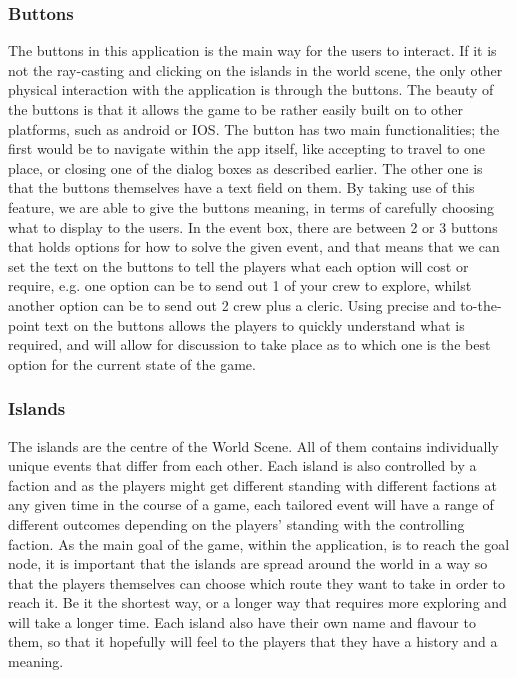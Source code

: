 \subsubsection{Buttons}	

The buttons in this application is the main way for the users to interact. If it is not the ray-casting and clicking on the islands in the world scene, the only other physical interaction with the application is through the buttons. The beauty of the buttons is that it allows the game to be rather easily built on to other platforms, such as android or IOS. The button has two main functionalities; the first would be to navigate within the app itself, like accepting to travel to one place, or closing one of the dialog boxes as described earlier. The other one is that the buttons themselves have a text field on them. By taking use of this feature, we are able to give the buttons meaning, in terms of carefully choosing what to display to the users. In the event box, there are between 2 or 3 buttons that holds options for how to solve the given event, and that means that we can set the text on the buttons to tell the players what each option will cost or require, e.g. one option can be to send out 1 of your crew to explore, whilst another option can be to send out 2 crew plus a cleric. Using precise and to-the-point text on the buttons allows the players to quickly understand what is required, and will allow for discussion to take place as to which one is the best option for the current state of the game.

\subsubsection{Islands}
	
The islands are the centre of the World Scene. All of them contains individually unique events that differ from each other. Each island is also controlled by a faction and as the players might get different standing with different factions at any given time in the course of a game, each tailored event will have a range of different outcomes depending on the players' standing with the controlling faction. 
As the main goal of the game, within the application, is to reach the goal node, it is important that the islands are spread around the world in a way so that the players themselves can choose which route they want to take in order to reach it. Be it the shortest way, or a longer way that requires more exploring and will take a longer time. Each island also have their own name and flavour to them, so that it hopefully will feel to the players that they have a history and a meaning.

